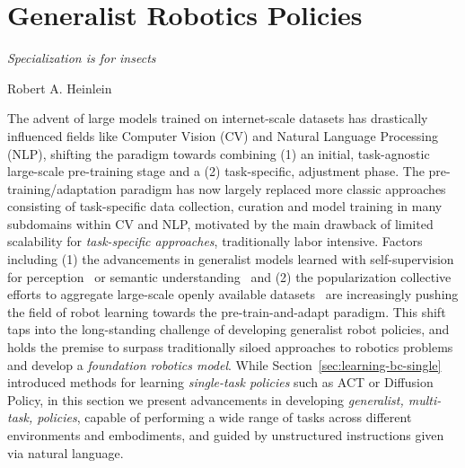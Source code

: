 \section{Generalist Robotics Policies}
\label{sec:learning-bc-generalist}

\epigraph{\textit{Specialization is for insects}}{Robert A. Heinlein}

The advent of large models trained on internet-scale datasets has drastically influenced fields like Computer Vision (CV) and Natural Language Processing (NLP), shifting the paradigm towards combining (1) an initial, task-agnostic large-scale pre-training stage and a (2) task-specific, adjustment phase.
The pre-training/adaptation paradigm has now largely replaced more classic approaches consisting of task-specific data collection, curation and model training in many subdomains within CV and NLP, motivated by the main drawback of limited scalability for \emph{task-specific approaches}, traditionally labor intensive.
Factors including (1) the advancements in generalist models learned with self-supervision for perception~\citep{oquabDINOv2LearningRobust2024} or semantic understanding~\citep{devlinBERTPretrainingDeep2019} and (2) the popularization collective efforts to aggregate large-scale openly available datasets~\citep{OpenXEmbodimentRobotic,DROIDLargeScaleIntheWild} are increasingly pushing the field of robot learning towards the pre-train-and-adapt paradigm.
This shift taps into the long-standing challenge of developing generalist robot policies, and holds the premise to surpass traditionally siloed approaches to robotics problems and develop a \emph{foundation robotics model}.
While Section~\ref{sec:learning-bc-single} introduced methods for learning \emph{single-task policies} such as ACT or Diffusion Policy, in this section we present advancements in developing \emph{generalist, multi-task, policies}, capable of performing a wide range of tasks across different environments and embodiments, and guided by unstructured instructions given via natural language.


